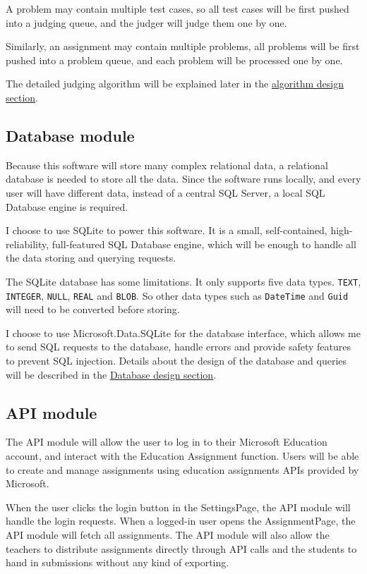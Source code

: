 \documentclass[a4paper]{report}
\begin{document}
A problem may contain multiple test cases, so all test cases will be first pushed into a judging queue, and the judger will judge them one by one.

Similarly, an assignment may contain multiple problems, all problems will be first pushed into a problem queue, and each problem will be processed one by one.

The detailed judging algorithm will be explained later in the 
\hyperref[sec:algorithm design]{algorithm design section}.

\subsection{Database module}

Because this software will store many complex relational data, a relational database is needed to store all the data. Since the software runs locally, and every user will have different data, instead of a central SQL Server, a local SQL Database engine is required.

I choose to use SQLite to power this software. It is a small, self-contained, high-reliability, full-featured SQL Database engine, which will be enough to handle all the data storing and querying requests.

The SQLite database has some limitations. It only supports five data types. \verb|TEXT|, \verb|INTEGER|, \verb|NULL|, \verb|REAL| and \verb|BLOB|. So other data types such as \verb|DateTime| and \verb|Guid| will need to be converted before storing.

I choose to use Microsoft.Data.SQLite for the database interface, which allows me to send SQL requests to the database, handle errors and provide safety features to prevent SQL injection. Details about the design of the database and queries will be described in the \hyperref[subsec:database design]{Database design section}.

\subsection{API module}

The API module will allow the user to log in to their Microsoft Education account, and interact with the Education Assignment function. Users will be able to create and manage assignments using education assignments APIs provided by Microsoft.

When the user clicks the login button in the SettingsPage, the API module will handle the login requests. When a logged-in user opens the AssignmentPage, the API module will fetch all assignments. The API module will also allow the teachers to distribute assignments directly through API calls and the students to hand in submissions without any kind of exporting.
\end{document}
